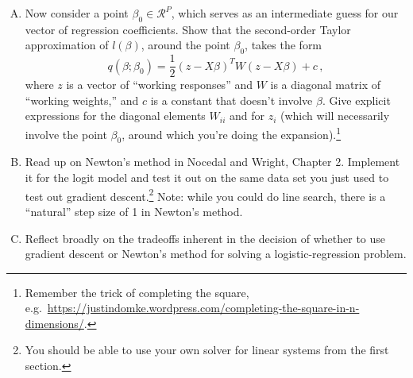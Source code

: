 \documentclass{mynotes}
\begin{document}
\begin{enumerate}[(A)]
\item Now consider a point $\beta_0 \in \mathcal{R}^P$, which serves as an intermediate guess for our vector of regression coefficients.  Show that the second-order Taylor approximation of $l(\beta)$, around the point $\beta_0$, takes the form
$$
q(\beta; \beta_0) = \frac{1}{2}(z - X \beta)^T W (z - X \beta) + c\, ,
$$
where $z$ is a vector of ``working responses'' and $W$ is a diagonal matrix of ``working weights,'' and $c$ is a constant that doesn't involve $\beta$.  Give explicit expressions for the diagonal elements $W_{ii}$ and for $z_i$ (which will necessarily involve the point $\beta_0$, around which you're doing the expansion).\footnote{Remember the trick of completing the square, e.g.~\url{https://justindomke.wordpress.com/completing-the-square-in-n-dimensions/}.}

\item Read up on Newton's method in Nocedal and Wright, Chapter 2.  Implement it for the logit model and test it out on the same data set you just used to test out gradient descent.\footnote{You should be able to use your own solver for linear systems from the first section.}  Note: while you could do line search, there is a ``natural'' step size of 1 in Newton's method.

\item Reflect broadly on the tradeoffs inherent in the decision of whether to use gradient descent or Newton's method for solving a logistic-regression problem.




\end{enumerate}
\end{document}
